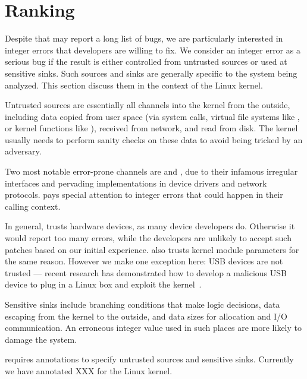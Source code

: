 \section{Ranking}

Despite that \sys may report a long list of bugs, we are particularly
interested in integer errors that developers are willing to fix.
We consider an integer error as a serious bug if the result is
either controlled from untrusted sources or used at sensitive sinks.
Such sources and sinks are generally specific to the system being
analyzed.  This section discuss them in the context of the Linux
kernel.

Untrusted sources are essentially all channels into the kernel from
the outside, including data copied from user space (via system
calls, virtual file systems like , or kernel functions
like ), received from network, and read from
disk. 
The kernel usually needs to perform sanity checks on these data to
avoid being tricked by an adversary.

Two most notable error-prone channels are  and ,
due to their infamous irregular interfaces and pervading implementations
in device drivers and network protocols.  \sys pays special attention
to integer errors that could happen in their calling context.

In general, \sys trusts hardware devices, as many device developers
do.  Otherwise it would report too many errors, while the
developers are unlikely to accept such patches based on our initial
experience.  \sys also trusts kernel module parameters for the same
reason.  However we make one exception here: USB devices are not
trusted --- recent research has demonstrated how to develop a
malicious USB device to plug in a Linux box and exploit the
kernel~\cite{usb:buffer-overflow}.

Sensitive sinks include branching conditions that make logic
decisions, data escaping from the kernel to the outside, and data
sizes for allocation and I/O communication.  An erroneous integer
value used in such places are more likely to damage the system.

\sys requires annotations to specify untrusted sources and sensitive
sinks.  Currently we have annotated XXX for the Linux kernel.
